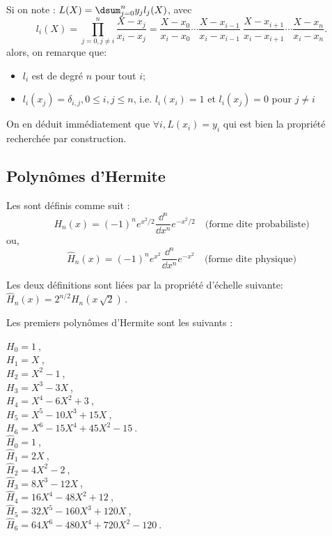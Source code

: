 \medskip
Si on note : $L(X) = \dsum_{j=0}^{n} y_j l_j(X)$, avec
\begin{equation}
l_i(X) = \prod_{j=0, j\neq i}^{n} \frac{X-x_j}{x_i-x_j} = \frac{X-x_0}{x_i-x_0} \cdots \frac{X-x_{i-1}}{x_i-x_{i-1}} ~ \frac{X-x_{i+1}}{x_i-x_{i+1}} \cdots \frac{X-x_{n}}{x_i-x_{n}}.
\end{equation}
alors, on remarque que:
\begin{itemize}
   \item $l_i$ est de degré $n$ pour tout $i$;
   \item $l_i(x_j) = \delta_{i,j}, 0 \leq i,j \leq n$, i.e. $l_i(x_i) = 1$ et $l_i(x_j) = 0$ pour $j\ne i$
\end{itemize}

On en déduit immédiatement que $\forall i, L(x_i) = y_i$ qui est bien la propriété
recherchée par construction.




\medskip
\subsection{Polynômes d'Hermite}

Les  
sont définis comme suit :
\begin{equation}
    H_n(x)=(-1)^n e^{x^2/2}\frac{\dd^n}{\dd x^n}e^{-x^2/2} \quad \text{(forme dite probabiliste)}
\end{equation}
ou,
\begin{equation}
    \widehat{H}_n(x)=(-1)^n e^{x^2}\frac{\dd^n}{\dd x^n}e^{-x^2} \quad \text{(forme dite physique)}
\end{equation}

Les deux définitions sont liées par la propriété d'échelle suivante: 
$\widehat{H}_n(x) = 2^{n/2}H_n \left(x\,\sqrt{2} \right)\,\!.$

\medskip
{}
Les premiers polynômes d'Hermite sont les suivants :
\begin{multicols}{2}
\noindent%
   $H_0=1~$,\\
   $H_1=X~$,\\
    $H_2=X^2-1~$,\\
    $H_3=X^3-3X~$,\\
    $H_4=X^4-6X^2+3~$,\\
    $H_5=X^5-10X^3+15X~$,\\
    $H_6=X^6-15X^4+45X^2-15~$.\\

\noindent%
    $\widehat{H}_0=1~$,\\
    $\widehat{H}_1=2X~$,\\
    $\widehat{H}_2=4X^2-2~$,\\
    $\widehat{H}_3=8X^3-12X~$,\\
    $\widehat{H}_4=16X^4-48X^2+12~$,\\
    $\widehat{H}_5=32X^5-160X^3+120X~$,\\
    $\widehat{H}_6=64X^6-480X^4+720X^2-120~$.
\end{multicols}

